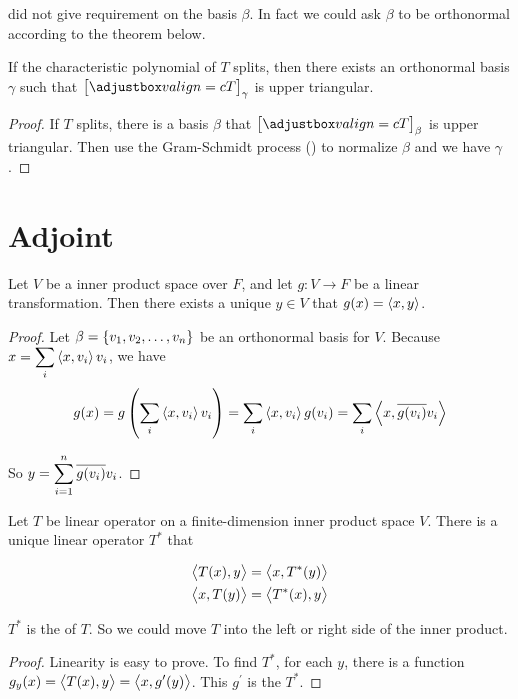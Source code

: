  did not give requirement on the basis $\beta$. In fact we could ask $\beta$ to be orthonormal according to the theorem below.

\begin{theorem}\label{schur_theorem}
    If the characteristic polynomial of $T$ splits, then there exists an orthonormal basis $\gamma$ such that $\coordinate{T}_\gamma$ is upper triangular.
\end{theorem}
\begin{proof}
    If $T$ splits, there is a basis $\beta$ that $\coordinate{T}_\beta$ is upper triangular. Then use the Gram-Schmidt process () to normalize $\beta$ and we have $\gamma$.
\end{proof}



\section{Adjoint}

\begin{theorem}\label{eiesz_representation_theorem}
Let $V$ be a inner product space over $F$, and let $g: V \rightarrow F$ be a linear transformation. Then there exists a unique $y \in V$ that $g(x) = \left\langle \displaystyle x, y \right\rangle$.
\end{theorem}
\begin{proof}
    Let $\beta = \set{v_1, v_2, \dots, v_n}$ be an orthonormal basis for $V$. Because $\displaystyle x = \sum_i \left\langle \displaystyle x, v_i \right\rangle v_i$, we have
    \begin{equation}
        g(x) = g\left(\sum_i \left\langle \displaystyle x, v_i \right\rangle v_i \right) = \sum_i \left\langle \displaystyle x, v_i \right\rangle g(v_i) = \sum_i \left\langle \displaystyle x, \overline{g(v_i)}v_i \right\rangle
    \end{equation}
    
    So $\displaystyle y = \sum_{i=1}^n \overline{g(v_i)} v_i$.
\end{proof}


\begin{theorem}[Adjoint]\label{adjoint_operator_definition}
    Let $T$ be linear operator on a finite-dimension inner product space $V$. There is a unique linear operator $T^*$ that
    
    \begin{equation}
        \begin{aligned}
            \left\langle \displaystyle T(x), y \right\rangle &= \left\langle \displaystyle x, T^* (y) \right\rangle \\
            \left\langle \displaystyle x, T(y) \right\rangle &= \left\langle \displaystyle T^* (x), y \right\rangle
        \end{aligned}
    \end{equation}
    
    
    $T^*$ is the  of $T$. So we could move $T$ into the left or right side of the inner product.
\end{theorem}
\begin{proof}
    Linearity is easy to prove. To find $T^*$, for each $y$, there is a function $g_y (x) = \left\langle \displaystyle T(x), y \right\rangle = \left\langle \displaystyle x, g^\prime (y) \right\rangle$. This $g^\prime$ is the $T^*$.
\end{proof}


